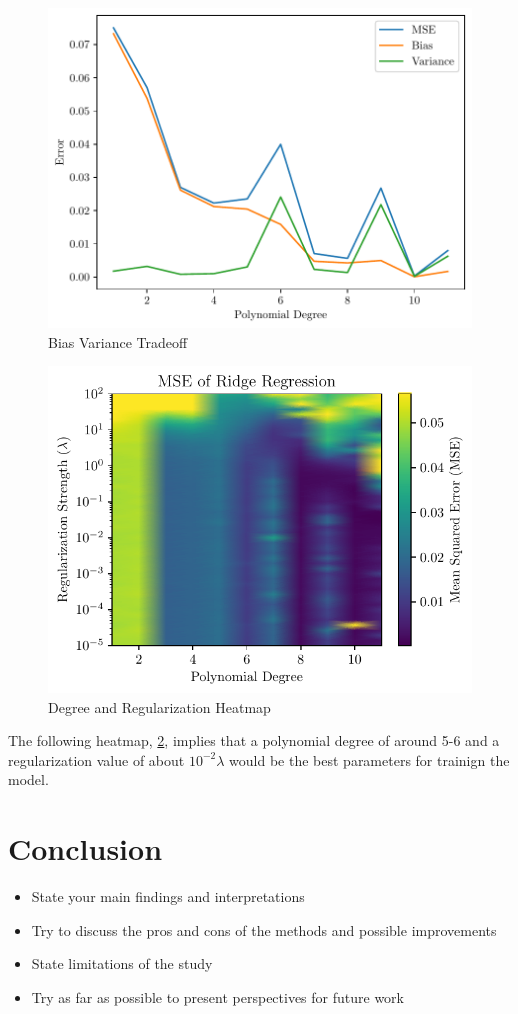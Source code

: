 \documentclass[amssymb,twocolumn,aps]{revtex4}
\begin{document}
\begin{figure}[h]
    \centering
    \includegraphics[width=0.9 \linewidth]{Figures/bias_variance_tradeoff.pdf}
    \caption{Bias Variance Tradeoff}
    \label{fig:BiasVariance1}
\end{figure}


\begin{figure}[h]
    \centering
    \includegraphics[width=0.9 \linewidth]{Figures/ridge_heatmap.pdf}
    \caption{Degree and Regularization Heatmap}
    \label{fig:DegRegHeat}
\end{figure}
The following heatmap, \ref{fig:DegRegHeat}, implies that a polynomial degree of around 5-6 and a regularization value of about $10^{-2} \lambda$ would be the best parameters for trainign the model.
\section{Conclusion}\label{section:conclusion} 
\begin{itemize}
    \item State your main findings and interpretations
    \item Try to discuss the pros and cons of the methods and possible improvements
    \item State limitations of the study
    \item Try as far as possible to present perspectives for future work
\end{itemize}


\end{document}
